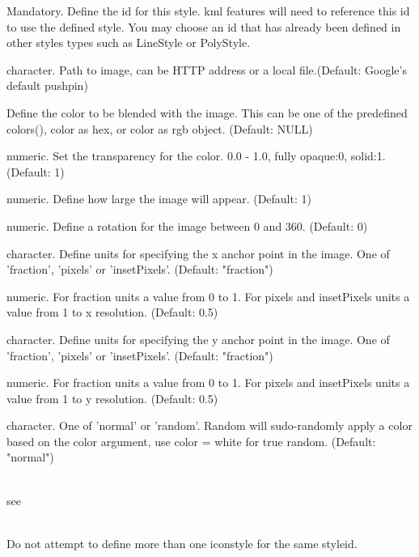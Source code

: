 \documentclass[a4paper]{book}
\begin{document}
\begin{Arguments}
\begin{ldescription}

\item[\code{styleid}] 
Mandatory. Define the id for this style. kml features will need to reference this id to use the defined style. You may choose an id that has already been defined in other styles types such as LineStyle or PolyStyle.


\item[\code{href}] character. Path to image, can be HTTP address or a local file.(Default: Google's default pushpin)


\item[\code{color}] Define the color to be blended with the image. This can be one of the predefined colors(), color as hex, or color as rgb object. (Default: NULL)
\item[\code{transparency}] numeric. Set the transparency for the color. 0.0 - 1.0, fully opaque:0, solid:1. (Default: 1)
\item[\code{scale}] numeric. Define how large the image will appear. (Default: 1)
\item[\code{heading}] numeric. Define a rotation for the image between 0 and 360. (Default: 0)
\item[\code{xunits}] character. Define units for specifying the x anchor point in the image. One of 'fraction', 'pixels' or 'insetPixels'. (Default: "fraction")
\item[\code{x}] numeric. For fraction units a value from 0 to 1. For pixels and insetPixels units a value from 1 to x resolution. (Default: 0.5)
\item[\code{yunits}] character. Define units for specifying the y anchor point in the image. One of 'fraction', 'pixels' or 'insetPixels'. (Default: "fraction")
\item[\code{y}] numeric. For fraction units a value from 0 to 1. For pixels and insetPixels units a value from 1 to y resolution. (Default: 0.5)
\item[\code{colorMode}] character. One of 'normal' or 'random'. Random will sudo-randomly apply a color based on the color argument, use color = white for true random. (Default: "normal")
\end{ldescription}
\end{Arguments}
%
\begin{Note}\relax
{}\\{}
see 
\\{}

\\{}
Do not attempt to define more than one iconstyle for the same styleid.

\end{Note}
\end{document}
